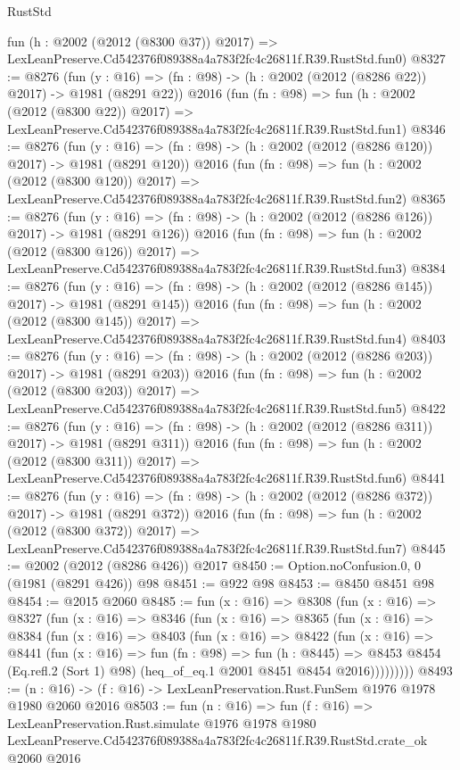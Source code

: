 \begin{lexlean}{RustStd}
\begin{coremodule}
    fun (h : @2002 (@2012 (@8300 @37)) @2017) =>
    LexLeanPreserve.Cd542376f089388a4a783f2fc4c26811f.R39.RustStd.fun0)
@8327 := @8276
    (fun (y : @16) => (fn : @98) -> (h : @2002 (@2012 (@8286 @22)) @2017) -> @1981 (@8291 @22))
    @2016
    (fun (fn : @98) =>
    fun (h : @2002 (@2012 (@8300 @22)) @2017) =>
    LexLeanPreserve.Cd542376f089388a4a783f2fc4c26811f.R39.RustStd.fun1)
@8346 := @8276
    (fun (y : @16) => (fn : @98) -> (h : @2002 (@2012 (@8286 @120)) @2017) -> @1981 (@8291 @120))
    @2016
    (fun (fn : @98) =>
    fun (h : @2002 (@2012 (@8300 @120)) @2017) =>
    LexLeanPreserve.Cd542376f089388a4a783f2fc4c26811f.R39.RustStd.fun2)
@8365 := @8276
    (fun (y : @16) => (fn : @98) -> (h : @2002 (@2012 (@8286 @126)) @2017) -> @1981 (@8291 @126))
    @2016
    (fun (fn : @98) =>
    fun (h : @2002 (@2012 (@8300 @126)) @2017) =>
    LexLeanPreserve.Cd542376f089388a4a783f2fc4c26811f.R39.RustStd.fun3)
@8384 := @8276
    (fun (y : @16) => (fn : @98) -> (h : @2002 (@2012 (@8286 @145)) @2017) -> @1981 (@8291 @145))
    @2016
    (fun (fn : @98) =>
    fun (h : @2002 (@2012 (@8300 @145)) @2017) =>
    LexLeanPreserve.Cd542376f089388a4a783f2fc4c26811f.R39.RustStd.fun4)
@8403 := @8276
    (fun (y : @16) => (fn : @98) -> (h : @2002 (@2012 (@8286 @203)) @2017) -> @1981 (@8291 @203))
    @2016
    (fun (fn : @98) =>
    fun (h : @2002 (@2012 (@8300 @203)) @2017) =>
    LexLeanPreserve.Cd542376f089388a4a783f2fc4c26811f.R39.RustStd.fun5)
@8422 := @8276
    (fun (y : @16) => (fn : @98) -> (h : @2002 (@2012 (@8286 @311)) @2017) -> @1981 (@8291 @311))
    @2016
    (fun (fn : @98) =>
    fun (h : @2002 (@2012 (@8300 @311)) @2017) =>
    LexLeanPreserve.Cd542376f089388a4a783f2fc4c26811f.R39.RustStd.fun6)
@8441 := @8276
    (fun (y : @16) => (fn : @98) -> (h : @2002 (@2012 (@8286 @372)) @2017) -> @1981 (@8291 @372))
    @2016
    (fun (fn : @98) =>
    fun (h : @2002 (@2012 (@8300 @372)) @2017) =>
    LexLeanPreserve.Cd542376f089388a4a783f2fc4c26811f.R39.RustStd.fun7)
@8445 := @2002 (@2012 (@8286 @426)) @2017
@8450 := Option.noConfusion.{0, 0} (@1981 (@8291 @426)) @98
@8451 := @922 @98
@8453 := @8450 @8451 @98
@8454 := @2015 @2060
@8485 := fun (x : @16) =>
  @8308
    (fun (x : @16) =>
    @8327
      (fun (x : @16) =>
      @8346
        (fun (x : @16) =>
        @8365
          (fun (x : @16) =>
          @8384
            (fun (x : @16) =>
            @8403
              (fun (x : @16) =>
              @8422
                (fun (x : @16) =>
                @8441
                  (fun (x : @16) =>
                  fun (fn : @98) =>
                  fun (h : @8445) =>
                  @8453
                    @8454
                    (Eq.refl.{2} (Sort 1) @98)
                    (heq_of_eq.{1} @2001 @8451 @8454 @2016)))))))))
@8493 := (n : @16) -> (f : @16) -> LexLeanPreservation.Rust.FunSem @1976 @1978 @1980 @2060 @2016
@8503 := fun (n : @16) =>
  fun (f : @16) =>
  LexLeanPreservation.Rust.simulate
    @1976
    @1978
    @1980
    LexLeanPreserve.Cd542376f089388a4a783f2fc4c26811f.R39.RustStd.crate_ok
    @2060
    @2016
\end{coremodule}
\end{lexlean}
